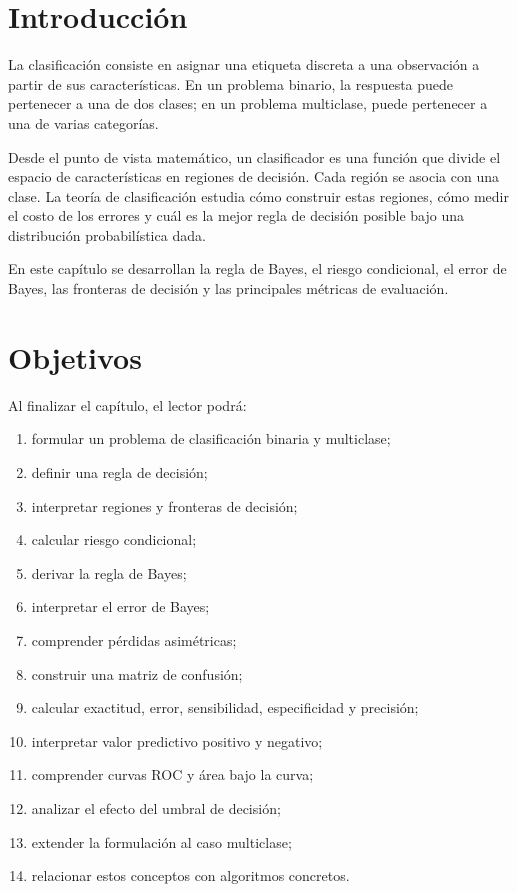 \documentclass[
  spanish,
  11pt,
  letterpaper,
  DIV=11,
  numbers=noendperiod]{scrreprt}
\providecommand{\tightlist}{%
  \setlength{\itemsep}{0pt}\setlength{\parskip}{0pt}}
\theoremstyle{definition}
\theoremstyle{plain}
\theoremstyle{definition}
\theoremstyle{remark}
\begin{document}
\section{Introducción}\label{introducciuxf3n-6}

La clasificación consiste en asignar una etiqueta discreta a una
observación a partir de sus características. En un problema binario, la
respuesta puede pertenecer a una de dos clases; en un problema
multiclase, puede pertenecer a una de varias categorías.

Desde el punto de vista matemático, un clasificador es una función que
divide el espacio de características en regiones de decisión. Cada
región se asocia con una clase. La teoría de clasificación estudia cómo
construir estas regiones, cómo medir el costo de los errores y cuál es
la mejor regla de decisión posible bajo una distribución probabilística
dada.

En este capítulo se desarrollan la regla de Bayes, el riesgo
condicional, el error de Bayes, las fronteras de decisión y las
principales métricas de evaluación.

\section{Objetivos}\label{objetivos-5}

Al finalizar el capítulo, el lector podrá:

\begin{enumerate}
\def\labelenumi{\arabic{enumi}.}
\tightlist
\item
  formular un problema de clasificación binaria y multiclase;
\item
  definir una regla de decisión;
\item
  interpretar regiones y fronteras de decisión;
\item
  calcular riesgo condicional;
\item
  derivar la regla de Bayes;
\item
  interpretar el error de Bayes;
\item
  comprender pérdidas asimétricas;
\item
  construir una matriz de confusión;
\item
  calcular exactitud, error, sensibilidad, especificidad y precisión;
\item
  interpretar valor predictivo positivo y negativo;
\item
  comprender curvas ROC y área bajo la curva;
\item
  analizar el efecto del umbral de decisión;
\item
  extender la formulación al caso multiclase;
\item
  relacionar estos conceptos con algoritmos concretos.
\end{enumerate}
\end{document}
